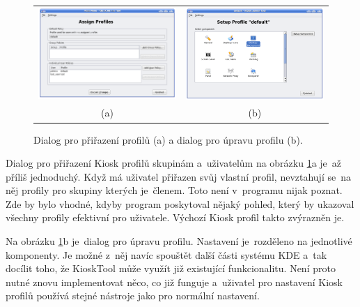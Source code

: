 \begin{figure}[ht]
\centering
\begin{tabular}{c c}
\includegraphics[width=7.2cm ,keepaspectratio]{obrazky/KioskToolKDE3/prirazeni_profilu.png}&
\includegraphics[width=7.2cm]{obrazky/KioskToolKDE3/seznam_komponent.png}\\
(a)&(b)\\
\end{tabular}
\caption{Dialog pro přiřazení profilů (a) a dialog pro úpravu profilu (b).}
\label{fig_7}
\end{figure}

Dialog pro přiřazení Kiosk profilů skupinám a~uživatelům na obrázku \ref{fig_7}a je~až příliš jednoduchý. Když má uživatel přiřazen svůj vlastní profil, nevztahují se~na něj profily pro skupiny kterých je~členem. Toto není v~programu nijak poznat. Zde by bylo vhodné, kdyby program poskytoval nějaký pohled, který by ukazoval všechny profily efektivní pro uživatele. Výchozí Kiosk profil takto zvýrazněn je.

Na obrázku \ref{fig_7}b je~dialog pro úpravu profilu. Nastavení je~rozděleno na jednotlivé komponenty. Je možné z~něj navíc spouštět další části systému KDE a~tak docílit toho, že KioskTool může využít již existující funkcionalitu. Není proto nutné znovu implementovat něco, co již funguje a~uživatel pro nastavení Kiosk profilů používá stejné nástroje jako pro normální nastavení.

